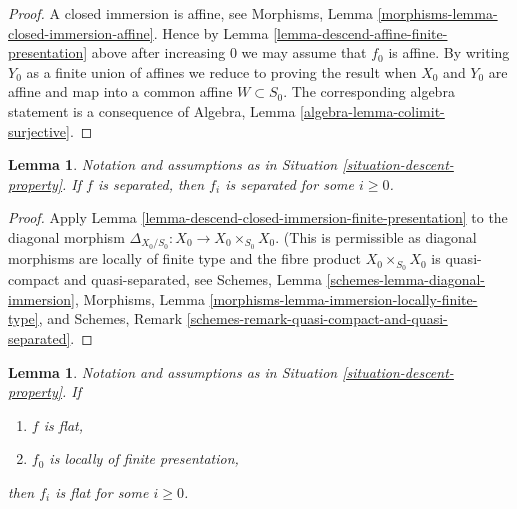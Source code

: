 \documentclass{stacks-project}
\theoremstyle{plain}
\newtheorem{lemma}[subsection]{Lemma}
\theoremstyle{definition}
\theoremstyle{remark}
\numberwithin{equation}{subsection}
\begin{document}
\begin{proof}
A closed immersion is affine, see
Morphisms, Lemma \ref{morphisms-lemma-closed-immersion-affine}.
Hence by Lemma \ref{lemma-descend-affine-finite-presentation} above
after increasing $0$ we may assume that $f_0$ is affine.
By writing $Y_0$ as a finite union of affines we reduce to proving
the result when $X_0$ and $Y_0$ are affine and map
into a common affine $W \subset S_0$. The corresponding algebra
statement is a consequence of
Algebra, Lemma \ref{algebra-lemma-colimit-surjective}.
\end{proof}

\begin{lemma}
\label{lemma-descend-separated-finite-presentation}
Notation and assumptions as in Situation \ref{situation-descent-property}.
If $f$ is separated, then $f_i$ is separated for some $i \geq 0$.
\end{lemma}

\begin{proof}
Apply Lemma \ref{lemma-descend-closed-immersion-finite-presentation}
to the diagonal morphism $\Delta_{X_0/S_0} : X_0 \to X_0 \times_{S_0} X_0$.
(This is permissible as diagonal morphisms are locally of finite type
and the fibre product $X_0 \times_{S_0} X_0$ is quasi-compact and
quasi-separated, see
Schemes, Lemma \ref{schemes-lemma-diagonal-immersion},
Morphisms, Lemma \ref{morphisms-lemma-immersion-locally-finite-type}, and
Schemes, Remark \ref{schemes-remark-quasi-compact-and-quasi-separated}.
\end{proof}

\begin{lemma}
\label{lemma-descend-flat-finite-presentation}
Notation and assumptions as in Situation \ref{situation-descent-property}.
If
\begin{enumerate}
\item $f$ is flat,
\item $f_0$ is locally of finite presentation,
\end{enumerate}
then $f_i$ is flat for some $i \geq 0$.
\end{lemma}
\end{document}
